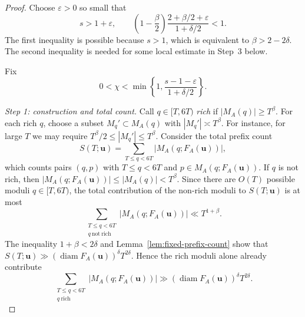 \documentclass[10pt,a4paper]{amsart}
\newcommand{\diam}{\operatorname{diam}}
\newcommand{\eps}{\varepsilon}
\begin{document}
\begin{proof}
Choose $\eps>0$ so small that
\begin{equation}\label{eq:eps-choice-pair}
 s>1+\eps,
 \qquad
 \left(1-\frac\beta2\right)
 \frac{2+\beta/2+\eps}{1+\delta/2}<1.
\end{equation}
The first inequality is possible because $s>1$, which is equivalent to
$\beta>2-2\delta$. The second inequality is needed for some local estimate in Step~3 below. 

Fix
\begin{equation}\label{eq:chi-choice}
 0<\chi<\min\left\{1,
 \frac{s-1-\eps}{1+\delta/2}\right\}.
\end{equation}

\medskip
\noindent\emph{Step 1: construction and total count.}
Call $q\in[T,6T)$ \emph{rich} if $|M_A(q)|\ge T^\beta$.  For each
rich $q$, choose a subset $M_q'\subset M_A(q)$ with
$|M_q'|\asymp T^\beta$. For instance, for large $T$ we may require
$T^\beta/2\le |M_q'|\le T^\beta$.  Consider the total prefix count
$$
 S(T;\mathbf{u})=\sum_{T\le q<6T}|M_A(q;F_A(\mathbf{u}))|,
$$
which counts pairs $(q,p)$ with $T\le q<6T$ and $p\in M_A(q;F_A(\mathbf{u}))$.
If $q$ is not rich, then
$|M_A(q;F_A(\mathbf{u}))|\le |M_A(q)|<T^\beta$.  Since there are $O(T)$ possible
moduli $q\in[T,6T)$, the total contribution of the non-rich moduli to
$S(T;\mathbf{u})$ is at most
$$
 \sum_{\substack{T\le q<6T\\ q\ \mathrm{not\ rich}}}
 |M_A(q;F_A(\mathbf{u}))|\ll T^{1+\beta}.
$$
The inequality $1+\beta<2\delta$ and Lemma~\ref{lem:fixed-prefix-count} show that
$S(T;\mathbf{u})\gg (\diam F_A(\mathbf{u}))^\delta T^{2\delta}$.  Hence the rich moduli alone
already contribute
\begin{equation}\label{eq:high-prefix-mass}
 \sum_{\substack{T\le q<6T\\q\ \mathrm{rich}}}
 |M_A(q;F_A(\mathbf{u}))|
 \gg (\diam F_A(\mathbf{u}))^\delta T^{2\delta}.
\end{equation}


\end{proof}
\end{document}
